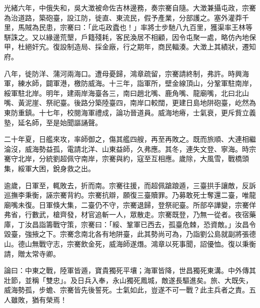 \begin{pinyinscope}
光緒六年，中俄失和，吳大澂被命佐吉林邊務，奏宗騫自隨。大澂兼攝屯政，宗騫為治道路，築砲臺，設江防，徙直、東流民，假予產業，分部護之。塞外灌莽千里，馬賊為民患，宗騫曰：「此屯政蠹也！」率將士步馳八九百里，獲渠率王林等駢誅之。又以緣邊荒墾，戶籍殘耗，客民渙居不相顧，因令屯聚一處，略仿內地保甲，杜絕奸宄。復設制造局、採金廠，行之期年，商民輻湊。大澂上其績狀，遷知府。

八年，徙防洋、蒲河兩海口。遭母憂歸，鴻章疏留，宗騫請終制，弗許。時興海軍，練水師，闢軍港，檄防威海。十三年，詣軍所，壁金線頂山，分鞏軍駐南岸，綏軍駐北岸。明年，建兩岸海臺各三，南曰趙北嘴、鹿角嘴、龍廟嘴，北曰北山嘴、黃泥崖、祭祀臺。後路分築陸臺四，南岸口較闊，更建日島地阱砲臺，屹然為東防重鎮。十七年，校閱海軍禮成，論功晉道員。威海地瘠，士氣衰，更斥貲立義塾，延名師，至是始聞謳誦聲。

二十年夏，日艦來攻，率師御之，傷其艦四艘，再至再敗之。既而旅順、大連相繼淪沒，威海勢益孤，電請北洋、山東益師，久弗應。其冬，連失文登、寧海。時宗騫守北岸，分統劉超佩守南岸，宗騫與約，寇至互相應。歲除，大風雪，戰橋頭集，綏軍大困，銳身救之出。

逾歲，日軍至，輒敗去，折而南。宗騫往援，而超佩蹌踉遁，三臺拱手讓敵，反訴巡撫李秉衡，誣宗騫背約。宗騫抗辯，願復三臺贖罪。乃募敢死士奪還二臺，唯龍廟嘴未復。日軍倏大集，二臺仍不守，宗騫退歸，登祭祀臺。所部卒譁變，宗騫佯弗省，行數武，槍齊發，材官追斬一人，眾散走。宗騫既登，乃無一從者。夜宿藥庫，丁汝昌詣籌戰守策，宗騫曰：「綏、鞏軍已西去，孤臺危棘，恐資敵。」汝昌令毀臺，強掖之下。宗騫念南北各有地阱臺，此其勢尚可為，乃詣劉公島就副將張德山。德山無戰守志，宗騫飲金死，威海師遂熸。鴻章以死事聞，詔優恤。復以秉衡請，贈太常寺卿。

論曰：中東之戰，陸軍皆遁，寶貴獨死平壤；海軍皆降，世昌獨死東溝。中外傳其壯節，並稱「雙忠」。及日兵入奉，永山獨死鳳城，敵遂長驅進矣。旅、大既失，威海勢孤，步蟾、宗騫皆先後誓死。士氣如此，豈遂不可一戰？此主兵者之責。五人雖敗，猶有榮焉！


\end{pinyinscope}